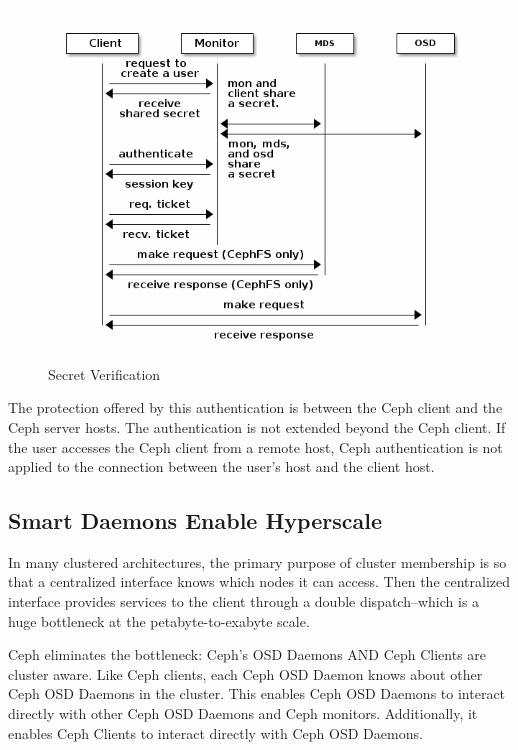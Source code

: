 \documentclass[12pt,a4paper]{report}
\begin{document}
\begin{figure}[h]
	\includegraphics[scale=0.60]{request_to_osd.png}
	\caption{Secret Verification}
	\label{fig:ticket_retrieval}
\end{figure}

The protection offered by this authentication is between the Ceph client and
the Ceph server hosts. The authentication is not extended beyond the Ceph
client. If the user accesses the Ceph client from a remote host, Ceph
authentication is not applied to the connection between the user’s host and the
client host.

\subsection{Smart Daemons Enable Hyperscale}

In many clustered architectures, the primary purpose of cluster membership is
so that a centralized interface knows which nodes it can access. Then the
centralized interface provides services to the client through a double
dispatch–which is a huge bottleneck at the petabyte-to-exabyte scale.

Ceph eliminates the bottleneck: Ceph’s OSD Daemons AND Ceph Clients are cluster
aware. Like Ceph clients, each Ceph OSD Daemon knows about other Ceph OSD
Daemons in the cluster. This enables Ceph OSD Daemons to interact directly with
other Ceph OSD Daemons and Ceph monitors. Additionally, it enables Ceph Clients
to interact directly with Ceph OSD Daemons.
\end{document}
